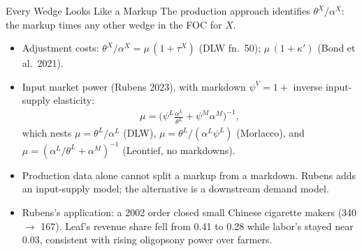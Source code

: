 \documentclass[aspectratio=169,10pt]{beamer}
\begin{document}
\begin{frame}{Every Wedge Looks Like a Markup}
The production approach identifies $\theta^X/\alpha^X$: the markup \alert{times} any other wedge in the FOC for $X$.
\begin{itemize}
\item Adjustment costs: $\theta^X/\alpha^X = \mu\,(1 + \tau^X)$ (DLW fn.\ 50); $\mu\,(1 + \kappa')$ (Bond et al.\ 2021).
\item Input market power (Rubens 2023), with markdown $\psi^V = 1 + $ inverse input-supply elasticity:
\begin{align*}
\mu = \Big(\psi^L \frac{\alpha^L}{\theta^L} + \psi^M \alpha^M\Big)^{-1},
\end{align*}
which nests $\mu = \theta^L/\alpha^L$ (DLW), $\mu = \theta^L/(\alpha^L \psi^L)$ (Morlacco), and $\mu = (\alpha^L/\theta^L + \alpha^M)^{-1}$ (Leontief, no markdowns).
\item Production data alone cannot split a markup from a markdown. Rubens adds an input-supply model; the alternative is a downstream demand model.
\item Rubens's application: a 2002 order closed small Chinese cigarette makers (340 $\to$ 167). Leaf's revenue share fell from 0.41 to 0.28 while labor's stayed near 0.03, consistent with rising oligopsony power over farmers.
\end{itemize}
\end{frame}
\end{document}
